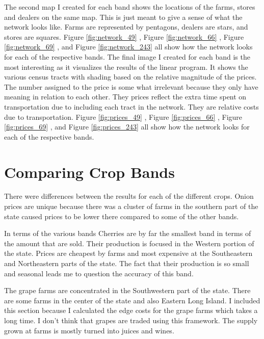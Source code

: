 \documentclass{report}
\begin{document}
The second map I created for each band shows the locations of the farms, stores and dealers on the same map. This is just meant to give a sense of what the network looks like. Farms are represented by pentagons, dealers are stars, and stores are squares. Figure \ref{fig:network_49} , Figure \ref{fig:network_66} , Figure \ref{fig:network_69} , and Figure \ref{fig:network_243} all show how the network looks for each of the respective bands. The final image I created for each band is the most interesting as it  visualizes the results of the linear program. It shows the various census tracts with shading based on the relative magnitude of the prices. The  number assigned to the price is some what irrelevant because they only have meaning in relation to each other. They prices reflect the extra time spent on transportation due to including each tract in the network. They are  relative costs due to transportation. Figure \ref{fig:prices_49} , Figure \ref{fig:prices_66} , Figure \ref{fig:prices_69} , and Figure \ref{fig:prices_243} all show how the network looks for each of the respective bands.

\section{Comparing Crop Bands}

There were differences between the results for each of the different crops. Onion prices are unique because there was a cluster of farms in the southern part of the state caused prices to be lower there compared to some of the other bands. 

In terms of the various bands Cherries are by far the smallest band in terms of the amount that are sold. Their production is focused in the Western portion of the state. Prices are cheapest by farms and most expensive at the Southeastern and Northeastern parts of the state. The fact that their production is so small and seasonal leads me to question the accuracy of this band. 

The grape farms are concentrated in the Southwestern part of the state. There are some farms in the center of the state and also Eastern Long Island. I included this section because I calculated the edge costs for the grape farms which takes a long time. I don't think that grapes  are traded using this framework. The supply grown at farms is mostly turned into juices and wines.
\end{document}
